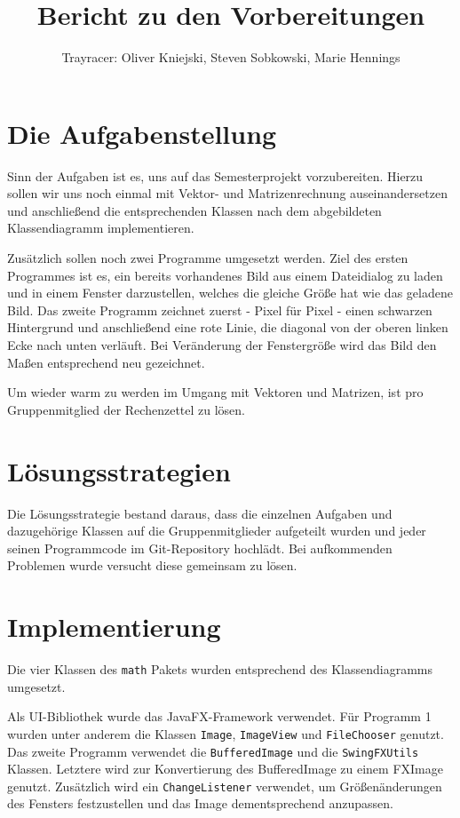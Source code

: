 \documentclass[a4paper,parskip=half,11pt]{scrartcl}
\author{Trayracer: Oliver Kniejski, Steven Sobkowski, Marie Hennings}
\title{Bericht zu den Vorbereitungen}
\begin{document}
 
\maketitle

\section*{Die Aufgabenstellung}

Sinn der Aufgaben ist es, uns auf das Semesterprojekt vorzubereiten.
Hierzu sollen wir uns noch einmal mit Vektor- und Matrizenrechnung auseinandersetzen und anschließend die
entsprechenden Klassen nach dem abgebildeten Klassendiagramm implementieren. 

Zusätzlich sollen noch zwei Programme umgesetzt werden.
Ziel des ersten Programmes ist es, ein bereits vorhandenes Bild aus einem Dateidialog zu laden und in einem Fenster darzustellen, welches die gleiche Größe hat wie das geladene Bild.
Das zweite Programm zeichnet zuerst - Pixel für Pixel - einen schwarzen Hintergrund und anschließend eine rote Linie, die diagonal von der oberen linken Ecke nach unten verläuft. 
Bei Veränderung der Fenstergröße wird das Bild den Maßen entsprechend neu gezeichnet.

Um wieder warm zu werden im Umgang mit Vektoren und Matrizen, ist pro Gruppenmitglied der Rechenzettel zu lösen. 

\section*{Lösungsstrategien}
Die Lösungsstrategie bestand daraus, dass die einzelnen Aufgaben und dazugehörige Klassen auf die Gruppenmitglieder  aufgeteilt wurden und jeder seinen Programmcode im Git-Repository hochlädt.
Bei aufkommenden Problemen wurde versucht diese gemeinsam zu lösen.

\section*{Implementierung}
Die vier Klassen des \texttt{\small math} Pakets wurden entsprechend des Klassendiagramms umgesetzt.

Als UI-Bibliothek wurde das JavaFX-Framework verwendet. Für Programm 1 wurden unter anderem die Klassen \texttt{\small Image}, \texttt{\small ImageView} und \texttt{\small FileChooser} genutzt. 
Das zweite Programm verwendet die \texttt{\small BufferedImage} und die \texttt{\small SwingFXUtils} Klassen. 
Letztere wird zur Konvertierung des BufferedImage zu einem FXImage genutzt. 
Zusätzlich wird ein \texttt{\small ChangeListener} verwendet, um Größenänderungen des Fensters festzustellen und das Image dementsprechend anzupassen.
\end{document}
